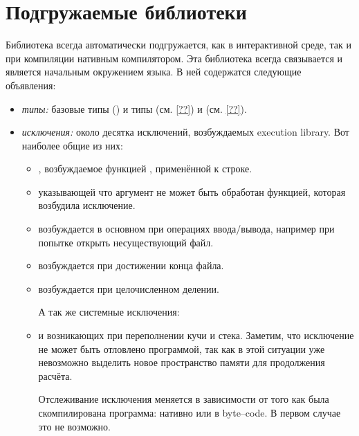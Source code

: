 \section{Подгружаемые библиотеки}
\label{sec:preloaded_library}

Библиотека  всегда автоматически подгружается, как в 
интерактивной среде, так и при компиляции нативным компилятором. Эта библиотека 
всегда связывается и является начальным окружением языка. В ней содержатся 
следующие объявления:

\begin{itemize}
	\item {\it типы:} базовые типы () и типы  (см. \ref{??}) и  (см. \ref{??}).

\item {\it исключения:} около десятка исключений, возбуждаемых execution 
library. Вот наиболее общие из них:

	\begin{itemize}
		\item {}, возбуждаемое функцией , 
применённой к строке.

		\item {} указывающей что аргумент не 
может быть обработан функцией, которая возбудила исключение.

		\item {} возбуждается в основном при операциях 
ввода/вывода, например при попытке открыть несуществующий файл.

		\item {} возбуждается при достижении конца файла.

		\item {} возбуждается при целочисленном делении.

		А так же системные исключения:
		
		\item {} и  возникающих при 
переполнении кучи и стека. Заметим, что исключение  не 
может быть отловлено программой, так как в этой ситуации уже невозможно 
выделить новое пространство памяти для продолжения расчёта.

		Отслеживание исключения  меняется в зависимости 
от того как была скомпилирована программа: нативно или в byte--code. В первом 
случае это не возможно.


\end{itemize}
\end{itemize}
